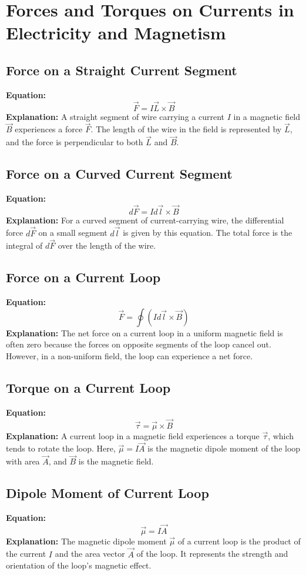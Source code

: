 \documentclass{article}
\begin{document}
\section*{Forces and Torques on Currents in Electricity and Magnetism}

\subsection*{Force on a Straight Current Segment}
\textbf{Equation:} 
\[ \vec{F} = I\vec{L} \times \vec{B} \]
\textbf{Explanation:} 
A straight segment of wire carrying a current \( I \) in a magnetic field \( \vec{B} \) experiences a force \( \vec{F} \). The length of the wire in the field is represented by \( \vec{L} \), and the force is perpendicular to both \( \vec{L} \) and \( \vec{B} \).

\subsection*{Force on a Curved Current Segment}
\textbf{Equation:} 
\[ d\vec{F} = I d\vec{l} \times \vec{B} \]
\textbf{Explanation:} 
For a curved segment of current-carrying wire, the differential force \( d\vec{F} \) on a small segment \( d\vec{l} \) is given by this equation. The total force is the integral of \( d\vec{F} \) over the length of the wire.

\subsection*{Force on a Current Loop}
\textbf{Equation:} 
\[ \vec{F} = \oint (I d\vec{l} \times \vec{B}) \]
\textbf{Explanation:} 
The net force on a current loop in a uniform magnetic field is often zero because the forces on opposite segments of the loop cancel out. However, in a non-uniform field, the loop can experience a net force.

\subsection*{Torque on a Current Loop}
\textbf{Equation:} 
\[ \vec{\tau} = \vec{\mu} \times \vec{B} \]
\textbf{Explanation:} 
A current loop in a magnetic field experiences a torque \( \vec{\tau} \), which tends to rotate the loop. Here, \( \vec{\mu} = I\vec{A} \) is the magnetic dipole moment of the loop with area \( \vec{A} \), and \( \vec{B} \) is the magnetic field.

\subsection*{Dipole Moment of Current Loop}
\textbf{Equation:} 
\[ \vec{\mu} = I\vec{A} \]
\textbf{Explanation:} 
The magnetic dipole moment \( \vec{\mu} \) of a current loop is the product of the current \( I \) and the area vector \( \vec{A} \) of the loop. It represents the strength and orientation of the loop's magnetic effect.
\end{document}
